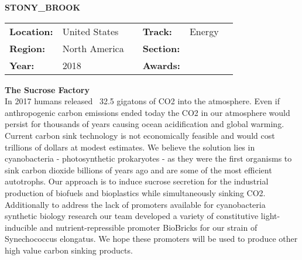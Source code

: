 \textbf{\uppercase{Stony\_Brook}} \FloatBarrier \begin{table}[h] \begin{tabular}{lp{2.5cm}llll} \textbf{Location:} & United States & \multicolumn{1}{|l}{} & \textbf{Track:}   & Energy \\ \textbf{Region:}   & North America   & \multicolumn{1}{|l}{} & \textbf{Section:} &  \\ \textbf{Year:}     & 2018   & \multicolumn{1}{|l}{} & \textbf{Awards:}  & \end{tabular} \end{table} \FloatBarrier \noindent\textbf{The Sucrose Factory} \vspace{.2cm}\\ 
In 2017 humans released ~32.5 gigatons of CO2 into the atmosphere. Even if anthropogenic carbon emissions ended today the CO2 in our atmosphere would persist for thousands of years causing ocean acidification and global warming. Current carbon sink technology is not economically feasible and would cost trillions of dollars at modest estimates. We believe the solution lies in cyanobacteria - photosynthetic prokaryotes - as they were the first organisms to sink carbon dioxide billions of years ago and are some of the most efficient autotrophs. Our approach is to induce sucrose secretion for the industrial production of biofuels and bioplastics while simultaneously sinking CO2. Additionally to address the lack of promoters available for cyanobacteria synthetic biology research our team developed a variety of constitutive light-inducible and nutrient-repressible promoter BioBricks for our strain of Synechococcus elongatus. We hope these promoters will be used to produce other high value carbon sinking products.
\vspace{2cm} $ $
\pagebreak

